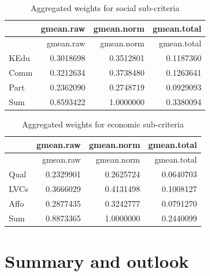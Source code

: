\documentclass [oneside,10pt,a4paper,ngerman,BCOR10mm,headsepline,parindent,final]{scrartcl}
\begin{document}
    
    \begin{longtable}[]{@{}lrrr@{}}
\caption{Aggregated weights for social sub-criteria}\tabularnewline
\toprule()
& gmean.raw & gmean.norm & gmean.total \\
\midrule()
\endfirsthead
\toprule()
& gmean.raw & gmean.norm & gmean.total \\
\midrule()
\endhead
KEdu & 0.3018698 & 0.3512801 & 0.1187360 \\
Comm & 0.3212634 & 0.3738480 & 0.1263641 \\
Part & 0.2362090 & 0.2748719 & 0.0929093 \\
Sum & 0.8593422 & 1.0000000 & 0.3380094 \\
\bottomrule()
\end{longtable}

    
    \begin{longtable}[]{@{}lrrr@{}}
\caption{Aggregated weights for economic sub-criteria}\tabularnewline
\toprule()
& gmean.raw & gmean.norm & gmean.total \\
\midrule()
\endfirsthead
\toprule()
& gmean.raw & gmean.norm & gmean.total \\
\midrule()
\endhead
Qual & 0.2329901 & 0.2625724 & 0.0640703 \\
LVCs & 0.3666029 & 0.4131498 & 0.1008127 \\
Affo & 0.2877435 & 0.3242777 & 0.0791270 \\
Sum & 0.8873365 & 1.0000000 & 0.2440099 \\
\bottomrule()
\end{longtable}

    
    \hypertarget{summary-and-outlook}{%
\section{Summary and outlook}\label{summary-and-outlook}}


    
    
    \printbibheading[heading=bibnumbered]
    \printbibliography[heading=subbibliography,keyword={URL},title={Online references}]
    \printbibliography[heading=subbibliography,keyword={book},title={Books, technical reports and others}]
    
\end{document}
